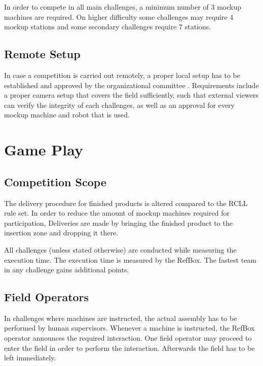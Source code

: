 \documentclass[12pt,twoside]{article}
\begin{document}
In order to compete in all main challenges, a minimum number of 3 mockup
machines are required. On higher difficulty some challenges may require
4 mockup stations and some secondary challenges require 7 stations.

\subsection{Remote Setup}
In case a competition is carried out remotely, a proper local setup has to
be established and approved by the organizational committee
.
Requirements include a proper camera setup that covers the field sufficiently,
such that external viewers can verify the integrity of each challenges,
as well as an approval for every mockup machine and robot that is used.

\section{Game Play}
\subsection{Competition Scope}

The delivery procedure for finished products is altered compared to the
\ac{RCLL} rule set. In order to reduce the amount of mockup machines required
for participation, Deliveries are made by bringing the finished product
to the insertion zone and dropping it there.

All challenges (unless stated otherwise) are conducted while measuring
the execution time. The execution time is measured by the RefBox.
The fastest team in any challenge gains additional points.

\subsection{Field Operators}
In challenges where machines are instructed, the actual assembly has to be
performed by human supervisors. Whenever a machine is instructed, the RefBox
operator announces the required interaction. One field operator may proceed
to enter the field in order to perform the interaction. Afterwards the field
has to be left immediately.
\end{document}
